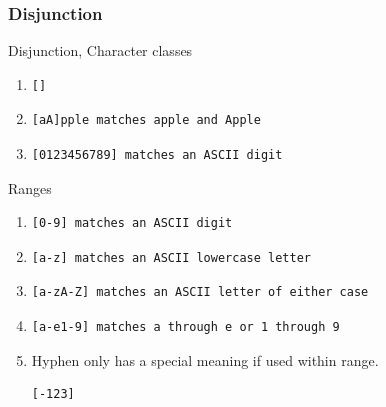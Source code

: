 \documentclass[compress, black]{beamer}
\begin{document}
\begin{frame}[fragile]
  \frametitle{Disjunction}
  \begin{large_enum}
    \item[-]<1->Disjunction, Character classes
        \begin{enumerate}
        \item[-]<2-> \begin{verbatim}
[]
\end{verbatim}
        \item[-]<3-> \begin{verbatim}
[aA]pple matches apple and Apple
\end{verbatim}
        \item[-]<4-> \begin{verbatim}
[0123456789] matches an ASCII digit
\end{verbatim}
        \end{enumerate}
    \item[-]<5->Ranges
      \begin{enumerate}
        \item[-]<6-> \begin{verbatim}
[0-9] matches an ASCII digit
\end{verbatim}
        \item[-]<7-> \begin{verbatim}
[a-z] matches an ASCII lowercase letter
\end{verbatim}
        \item[-]<8-> \begin{verbatim}
[a-zA-Z] matches an ASCII letter of either case
\end{verbatim}
        \item[-]<9-> \begin{verbatim}
[a-e1-9] matches a through e or 1 through 9
\end{verbatim}
        \item[-]<10-> Hyphen only has a special meaning if used within range. \begin{verbatim}
[-123]
\end{verbatim}
      \end{enumerate}
  \end{large_enum}
\end{frame}
\end{document}
